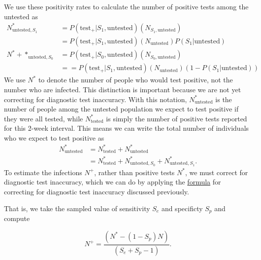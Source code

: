 \documentclass[12pt,twoside]{smiththesis}
\begin{document}
We use these positivity rates to calculate the number of positive tests among the untested as
\begin{align*}
N^*_{\text{untested},S_1} &= P( \text{test}_+ | S_1, \text{untested}) ( N_{S_1,\text{untested}}) \\
&= P( \text{test}_+ | S_1, \text{untested}) (N_{\text{untested}} ) P(S_1|\text{untested})\\
N^*+*_{\text{untested},S_0} &= P( \text{test}_+ | S_0, \text{untested}) ( N_{S_0,\text{untested}})\\
&== P( \text{test}_+ | S_1, \text{untested}) (N_{\text{untested}} ) (1- P(S_1|\text{untested}))
\end{align*}
We use \(N^*\) to denote the number of people who would test positive, not the number who are infected. This distinction is important because we are not yet correcting for diagnostic test inaccuracy. With this notation, \(N^*_{\text{untested}}\) is the number of people among the untested population we expect to test positive if they were all tested, while \(N^*_{\text{tested}}\) is simply the number of positive tests reported for this 2-week interval. This means we can write the total number of individuals who we expect to test positive as
\begin{align*}
 N^*_{\text{untested}}
 &= N^*_{\text{tested}} + N^*_{\text{untested}} \\
 &= N^*_{\text{tested}} + N^*_{\text{untested}, S_0} + N^*_{\text{untested}, S_1}.
\end{align*}
To estimate the infections \(N^+\), rather than positive tests \(N^*\), we must correct for diagnostic test inaccuracy, which we can do by applying the \protect\hyperlink{correct-test-inaccuracy}{formula} for correcting for diagnostic test inaccuracy discussed previously.

That is, we take the sampled value of sensitivity \(S_e\) and specificty \(S_p\) and compute

\[N^+ = \dfrac{(N^* - (1 - S_p) N) } { (S_e + S_p - 1) }.\]
\end{document}
